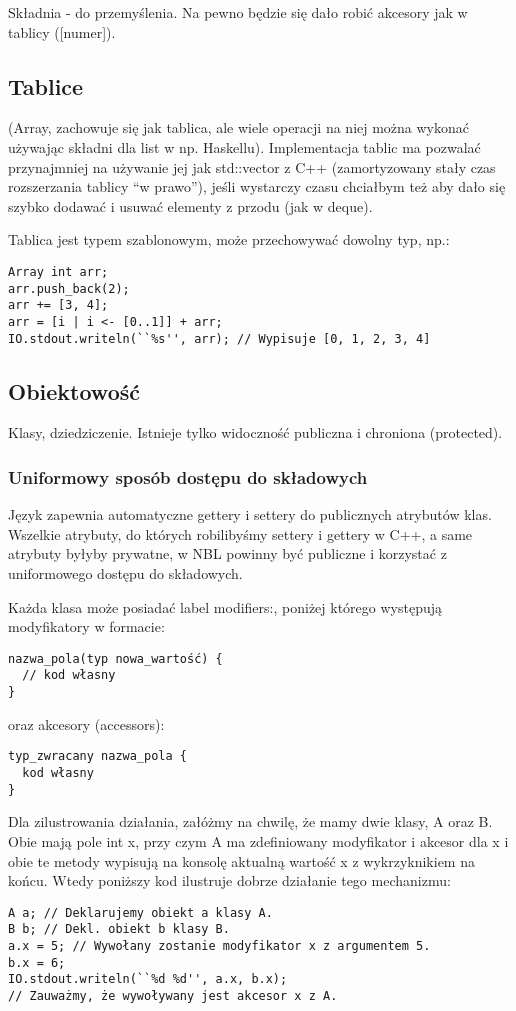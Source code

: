 \documentclass[a4paper,10pt]{scrartcl}
\begin{document}
Składnia - do przemyślenia. Na pewno będzie się dało robić akcesory jak w tablicy ([numer]).

\subsection{Tablice}
(Array, zachowuje się jak tablica, ale wiele operacji na niej można wykonać
używając składni dla list w np. Haskellu). Implementacja tablic ma pozwalać przynajmniej na używanie jej jak std::vector z C++ (zamortyzowany stały
czas rozszerzania tablicy ``w prawo''), jeśli wystarczy czasu chciałbym też aby dało się szybko dodawać i usuwać elementy z przodu (jak w deque).

Tablica jest typem szablonowym, może przechowywać dowolny typ, np.:
\begin{lstlisting}
Array int arr;
arr.push_back(2);
arr += [3, 4];
arr = [i | i <- [0..1]] + arr;
IO.stdout.writeln(``%s'', arr);	// Wypisuje [0, 1, 2, 3, 4]
\end{lstlisting}

\subsection{Obiektowość}
Klasy, dziedziczenie. Istnieje tylko widoczność publiczna i chroniona (protected). 

\subsubsection{Uniformowy sposób dostępu do składowych}
Język zapewnia automatyczne gettery i settery do publicznych atrybutów klas. Wszelkie atrybuty, do których robilibyśmy settery i gettery w C++, a
same atrybuty byłyby prywatne, w NBL powinny być publiczne i korzystać z uniformowego dostępu do składowych.

Każda klasa może posiadać label modifiers:, poniżej którego występują modyfikatory w formacie:
\begin{lstlisting}
nazwa_pola(typ nowa_wartość) {
  // kod własny
}
\end{lstlisting}

oraz akcesory (accessors):
\begin{lstlisting}
typ_zwracany nazwa_pola {
  kod własny
}
\end{lstlisting}

Dla zilustrowania działania, załóżmy na chwilę, że mamy dwie klasy, A oraz B. Obie mają pole int x, przy czym A ma zdefiniowany modyfikator i
akcesor dla x i obie te metody wypisują na konsolę aktualną wartość x z wykrzyknikiem na końcu. Wtedy poniższy kod ilustruje dobrze działanie
tego mechanizmu:
\begin{lstlisting}
A a; // Deklarujemy obiekt a klasy A.
B b; // Dekl. obiekt b klasy B.
a.x = 5; // Wywołany zostanie modyfikator x z argumentem 5.
b.x = 6;
IO.stdout.writeln(``%d %d'', a.x, b.x); 
// Zauważmy, że wywoływany jest akcesor x z A.
\end{lstlisting}
\end{document}
